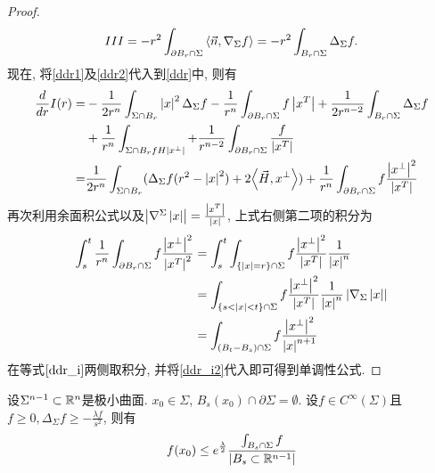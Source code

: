\begin{proof}
\begin{equation}
        III=-r^2\int_{\partial B_r\cap \Sigma} {\left < \vec{n}, \nabla_\Sigma f \right >} =-r^2\int_{{B_r} \cap \Sigma} \Delta_{\Sigma}f.
     \end{equation}
     现在, 将\eqref{ddr1}及\eqref{ddr2}代入到\eqref{ddr}中, 则有
     \begin{equation}\label{ddr_i}
        \begin{split}
            \frac{d}{dr} I(r) =& -\frac{1}{2r^n}\int_{\Sigma \cap B_r}\left | x \right |^2 \Delta_\Sigma f - \frac{1}{r^n} \int_{\partial B_r\cap \Sigma} f \left | x^T \right | + \frac{1}{2r^{n-2}} \int_{B_r\cap \Sigma} \Delta_\Sigma f \\
            &+ \frac{1}{r^n} \int_{\Sigma \cap B_r fH\left | x^\perp \right |} + \frac{1}{r^{n-2}} \int_{\partial B_r \cap \Sigma} \frac{f}{\left | x^T \right |} \\
            =& \frac{1}{2r^n} \int_{\Sigma \cap B_r}(\Delta_\Sigma f(r^2-\left | x \right |^2) + 2{\left < \vec{H}, x^\perp \right >}) + \frac{1}{r^n}\int_{\partial B_r\cap \Sigma} f \frac{\left | x^\perp \right |^2}{\left | x^T \right |}
        \end{split}
     \end{equation}
     再次利用余面积公式以及$\left | \nabla^\Sigma\left | x \right | \right |=\frac{\left | x^T \right |}{\left | x \right |}$, 上式右侧第二项的积分为
     \begin{equation} \label{ddr_i2}
        \begin{split}
            \int^t_s \frac{1}{r^n} \int_{\partial B_r \cap \Sigma} f \frac{\left | x^\perp \right |^2}{\left | x^T \right |^2} &= \int^t_s \int_{\{\left | x \right | = r\}\cap \Sigma} f  \frac{\left | x^\perp \right |^2}{\left | x^T \right |} \frac{1}{\left | x \right |^n} \\
            &= \int_{\{s<\left | x \right |<t\}\cap \Sigma } f \frac{\left | x^\perp \right |^2}{\left | x^T \right |}\frac{1}{\left | x \right |^n}\left | \nabla_\Sigma\left | x \right | \right | \\
            &=\int_{(B_t-B_s)\cap \Sigma} f \frac{\left | x^\perp \right |^2}{\left | x \right |^{n+1}}
        \end{split}
     \end{equation}
     在等式$\eqref{ddr_i}$两侧取积分, 并将\eqref{ddr_i2}代入即可得到单调性公式.
\end{proof}
\begin{corollary}
    设$\Sigma^{n-1} \subset \mathbb{R}^n$是极小曲面. $x_0 \in \Sigma$, $B_s(x_0) \cap \partial \Sigma = \emptyset$. 设$f \in C^\infty(\Sigma)$且 $f \ge 0, \Delta_{\Sigma}f \ge -\frac{\lambda f}{s^2}$, 则有
    \begin{equation}
        f(x_0) \le e^{\frac{\lambda}{2}}\frac{\int_{B_s\cap \Sigma}f}{\left | B_s\subset \mathbb{R}^{n-1} \right |}
    \end{equation}
\end{corollary}
